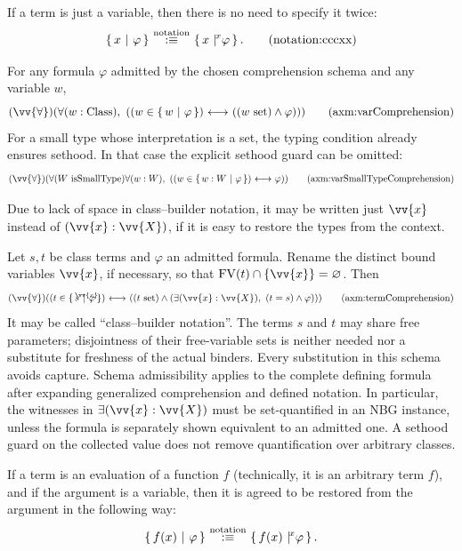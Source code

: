 \begin{notation}
If a term is just a variable, then there is no need to specify it twice:
\[
\cc{x}{\phi} \equivnot \ccc{x}{x}{\phi}.
\labeltag{notation:cccxx}
\]%
\end{notation}

\begin{axiom}%
For any formula $\varphi$ admitted by the chosen comprehension schema and
any variable $w$,
\[
(\vv{\forall})(\forall (w:\Class),\ ((w\in\cc{w}{\varphi}) \iff ((w\set)\land \varphi)))
\clabeltagd{axm}{varComprehension}
\]
For a small type whose interpretation is a set, the typing condition already ensures sethood. In that case the explicit sethood guard can be omitted:
\[
(\vv{\forall})(\forall (W\text{ isSmallType}) \forall (w:W),\ ((w\in\cc{w:W}{\varphi}) \iff \varphi))
\clabeltagd{axm}{varSmallTypeComprehension}
\]
\end{axiom}
\begin{notation}
Due to lack of space in class--builder notation, it may be written just $\vv{x}$ instead of $(\vv{x}:\vv{X})$, if it is easy to restore the types from the context.
\end{notation}
\begin{axiom}%
Let $s,t$ be class terms and $\varphi$ an admitted formula. Rename the
distinct bound variables $\vv{x}$, if necessary, so that
$\FV(t)\cap\{\vv{x}\}=\emptyclass$. Then
\[
(\vv{\forall})((t\in\ccc{\vv{x}}{s}{\varphi})
\iff
((t\set)\land (\exists (\vv{x}:\vv{X}),\ (t=s) \land \varphi)))
\clabeltagd{axm}{termComprehension}
\]
It may be called ``class--builder notation''.
The terms $s$ and $t$ may share free parameters; disjointness of their
free-variable sets is neither needed nor a substitute for freshness of
the actual binders. Every substitution in this schema avoids capture.
Schema admissibility applies to the complete defining formula after
expanding generalized comprehension and defined notation. In particular,
the witnesses in $\exists(\vv{x}:\vv{X})$ must be set-quantified in an
NBG instance, unless the formula is separately shown equivalent to an
admitted one. A sethood guard on the collected value does not remove
quantification over arbitrary classes.
\end{axiom}
\begin{notation}
If a term is an evaluation of a function $f$ (technically, it is an arbitrary term $f$), and if the argument is a variable, then it is agreed to be restored from the argument in the following way:
\[
\cc{f(x)}{\phi} \equivnot \ccc{x}{f(x)}{\phi}.
\]
\end{notation}


